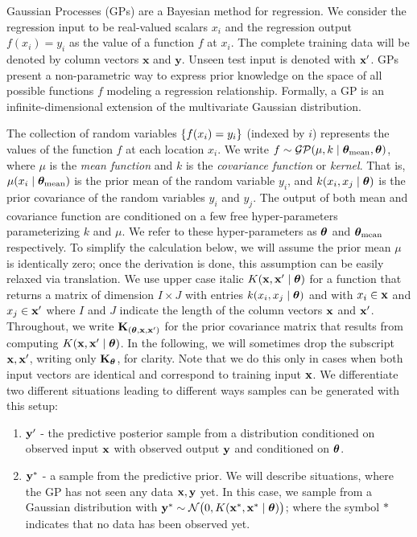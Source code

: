 Gaussian Processes (GPs) are a Bayesian method for regression. We consider the regression input
to be real-valued scalars $x_i$ and the regression output $f(x_i)=y_i$ as the value of a
function $f$ at $x_i$. The complete training data will be denoted by column
vectors $\mathbf{x}$ and $\mathbf{y}$. Unseen test input is denoted with
$\mathbf{x}^\prime$.
\ac{GP}s present a non-parametric way to express prior knowledge on the space of all possible functions $f$ modeling
a regression relationship.
Formally, a GP is an infinite-dimensional extension of the multivariate Gaussian distribution.

The collection of random variables $\left\{ f(x_i)=y_i \right\}$ (indexed by $i$) represents the
values of the function $f$ at each location $x_i$.
We write $f \sim \mathcal{GP}(\mu,k \mid \bm{\theta}_\text{mean},\bm{\theta})$, where
$\mu$ is the {\em mean function} and $k$ is the {\em covariance function} or {\em kernel}.
That is, $\mu(x_i \mid \bm{\theta}_\text{mean})$ is the prior mean of the random variable $y_i$, and
$k(x_i,x_j \mid \bm{\theta})$ is the prior covariance of the random variables $y_i$
and $y_j$. The output of both mean and covariance function are conditioned on a
few free hyper-parameters parameterizing $k$ and $\mu$. We refer to these
hyper-parameters as $\bm{\theta}$ and
$\bm{\theta}_\text{mean}$
respectively.
To simplify the calculation below, we will assume the prior mean $\mu$ is identically zero; once the derivation is done, this assumption can be easily relaxed via translation.
We use upper case
italic $K(\mathbf{x},\mathbf{x}^\prime \mid \bm{\theta} )$ for a function that returns a matrix of dimension $I \times J$
with entries $k(x_i,x_j \mid \bm{\theta} )$ and with $x_i \in \mathbf{x}$ and $x_j \in
\mathbf{x}^\prime$ where $I$ and $J$ indicate the length of the column vectors $\mathbf{x}$ and
$\mathbf{x}^\prime$.
Throughout, we write $\mathbf{K}_{(\bm{\theta},\mathbf{x},\mathbf{x}^\prime)}$ for the prior covariance
matrix that results from computing  $K(\mathbf{x},\mathbf{x}^\prime \mid \bm{\theta} )$. In the
following, we will sometimes drop the subscript $\mathbf{x},\mathbf{x}^\prime$, writing
only $\mathbf{K}_{\bm{\theta}}$, for clarity. Note that we do this only in cases when both
input vectors are identical and correspond to training input $\mathbf{x}$.
We differentiate two different situations leading to different ways samples can be generated with
this setup:
\begin{enumerate}
\item ${\mathbf{y}^\prime}$ - the predictive posterior sample from a distribution
conditioned on observed input $\mathbf{x}$ with observed output $\mathbf{y}$ and conditioned on
$\bm{\theta}$.
\item $\mathbf{y}^*$ - a sample from the predictive prior. We will describe
situations, where the \ac{GP} has not seen any data $\mathbf{x},\mathbf{y}$ yet. In this
case, we sample from a Gaussian distribution with 
     $\mathbf{y}^* \sim \mathcal{N}\big(0,K(\mathbf{x}^*, \mathbf{x}^* \mid \bm{\theta}
)\big)$; where the symbol $*$ indicates that no data has been observed yet. 
\end{enumerate}

